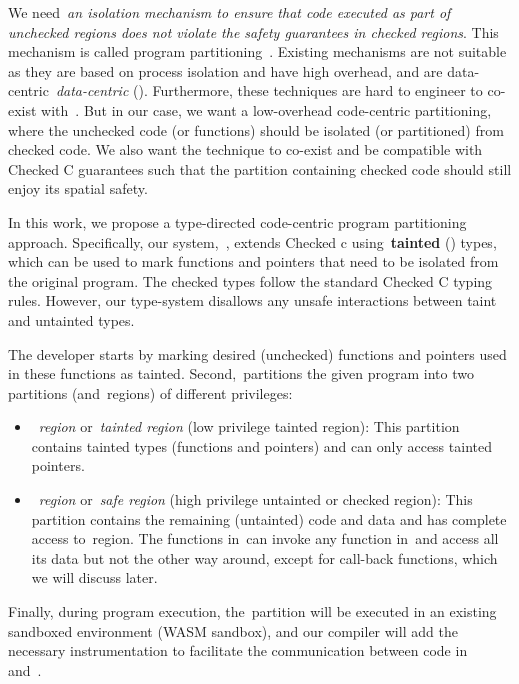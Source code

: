We need~\emph{an isolation mechanism to ensure that code executed as part of unchecked regions does not violate the safety guarantees in checked regions}.
\fi
This mechanism is called program partitioning~\cite{rul2009towards}.
Existing mechanisms are not suitable as they are based on process isolation and have high overhead, and are data-centric~\emph{data-centric} ().
Furthermore, these techniques are hard to engineer to co-exist with~\checkedc.
But in our case, we want a low-overhead code-centric partitioning, where the unchecked code (or functions) should be isolated (or partitioned) from checked code. We also want the technique to co-exist and be compatible with Checked C guarantees such that the partition containing checked code should still enjoy its spatial safety.

In this work, we propose a type-directed code-centric program partitioning approach.
Specifically, our system,~\systemname, extends Checked c using~\textbf{tainted} (\taintt) types, which can be used to mark functions and pointers that need to be isolated from the original program.
The checked types follow the standard Checked C typing rules.
However, our type-system disallows any unsafe interactions between taint and untainted types.
 
The developer starts by marking desired (\ie unchecked) functions and pointers used in these functions as tainted.
Second,~\systemname partitions the given program into two partitions (\umode and~\cmode regions)  of different privileges:

\begin{itemize}
\item~\umode \emph{region} or~\emph{tainted region} (low privilege tainted region): This partition contains tainted types (\ie functions and pointers) and can only access tainted pointers.
\item~\cmode \emph{region} or~\emph{safe region} (high privilege untainted or checked region): This partition contains the remaining (untainted) code and data and has complete access to~\cmode region.
The functions in~\cregion can invoke any function in~\ucregion and access all its data but not the other way around, except for call-back functions, which we will discuss later.
\end{itemize}
Finally, during program execution, the~\ucregion partition will be executed in an existing sandboxed environment (\eg WASM sandbox), and our compiler will add the necessary instrumentation to facilitate the communication between code in~\cregion{} and~\ucregion{}.

